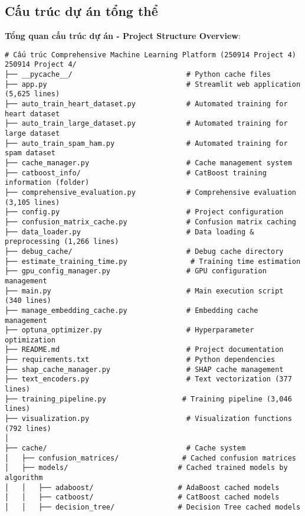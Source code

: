 \subsection{Cấu trúc dự án tổng thể}

\textbf{Tổng quan cấu trúc dự án - Project Structure Overview}:

\begin{verbatim}
# Cấu trúc Comprehensive Machine Learning Platform (250914 Project 4)
250914 Project 4/
├── __pycache__/                           # Python cache files
├── app.py                                 # Streamlit web application (5,625 lines)
├── auto_train_heart_dataset.py            # Automated training for heart dataset
├── auto_train_large_dataset.py            # Automated training for large dataset
├── auto_train_spam_ham.py                 # Automated training for spam dataset
├── cache_manager.py                       # Cache management system
├── catboost_info/                         # CatBoost training information (folder)
├── comprehensive_evaluation.py            # Comprehensive evaluation (3,105 lines)
├── config.py                              # Project configuration
├── confusion_matrix_cache.py              # Confusion matrix caching
├── data_loader.py                         # Data loading & preprocessing (1,266 lines)
├── debug_cache/                           # Debug cache directory
├── estimate_training_time.py               # Training time estimation
├── gpu_config_manager.py                  # GPU configuration management
├── main.py                                # Main execution script (340 lines)
├── manage_embedding_cache.py              # Embedding cache management
├── optuna_optimizer.py                    # Hyperparameter optimization
├── README.md                              # Project documentation
├── requirements.txt                       # Python dependencies
├── shap_cache_manager.py                  # SHAP cache management
├── text_encoders.py                       # Text vectorization (377 lines)
├── training_pipeline.py                  # Training pipeline (3,046 lines)
├── visualization.py                       # Visualization functions (792 lines)
│
├── cache/                                 # Cache system
│   ├── confusion_matrices/               # Cached confusion matrices
│   ├── models/                          # Cached trained models by algorithm
│   │   ├── adaboost/                    # AdaBoost cached models
│   │   ├── catboost/                    # CatBoost cached models
│   │   ├── decision_tree/               # Decision Tree cached models

\end{verbatim}
